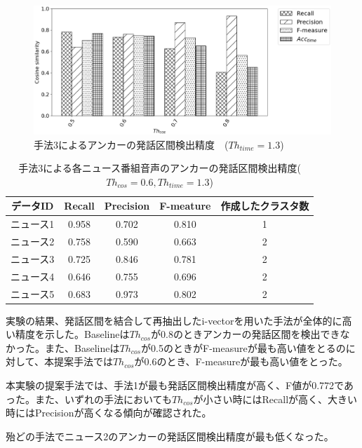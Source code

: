{\begin{figure}[H]
  \begin{center}
    \includegraphics[scale=0.5]{./figure/prob3_13.eps}
  \end{center}
  \caption{手法3によるアンカーの発話区間検出精度　($Th_{time}=1.3$) \label{fig:result_anchor_prob3}}
\end{figure}

\begin{table}[H]
  \begin{center}
    \caption{手法3による各ニュース番組音声のアンカーの発話区間検出精度($Th_{cos}=0.6,Th_{time}=1.3$) \label{table:prob3_eachnews}}
    \begin{tabular}{|c||c|c|c|c|} \hline
データID & Recall & Precision & F-meature & 作成したクラスタ数\\ \hline
ニュース1 & 0.958 & 0.702 & 0.810 & 1 \\ \hline
ニュース2 & 0.758 & 0.590 & 0.663 & 2 \\ \hline
ニュース3 & 0.725 & 0.846 & 0.781 & 2 \\ \hline
ニュース4 & 0.646 & 0.755 & 0.696 & 2 \\ \hline
ニュース5 & 0.683 & 0.973 & 0.802 & 2 \\ \hline
    \end{tabular}
  \end{center}
\end{table}

実験の結果、発話区間を結合して再抽出したi-vectorを用いた手法が全体的に高い精度を示した。Baselineは$Th_{cos}$が0.8のときアンカーの発話区間を検出できなかった。また、Baselineは$Th_{cos}$が0.5のときがF-measureが最も高い値をとるのに対して、本提案手法では$Th_{cos}$が0.6のとき、F-measureが最も高い値をとった。\par
本実験の提案手法では、手法1が最も発話区間検出精度が高く、F値が0.772であった。また、いずれの手法においても$Th_{cos}$が小さい時にはRecallが高く、大きい時にはPrecisionが高くなる傾向が確認された。\par
殆どの手法でニュース2のアンカーの発話区間検出精度が最も低くなった。

}
